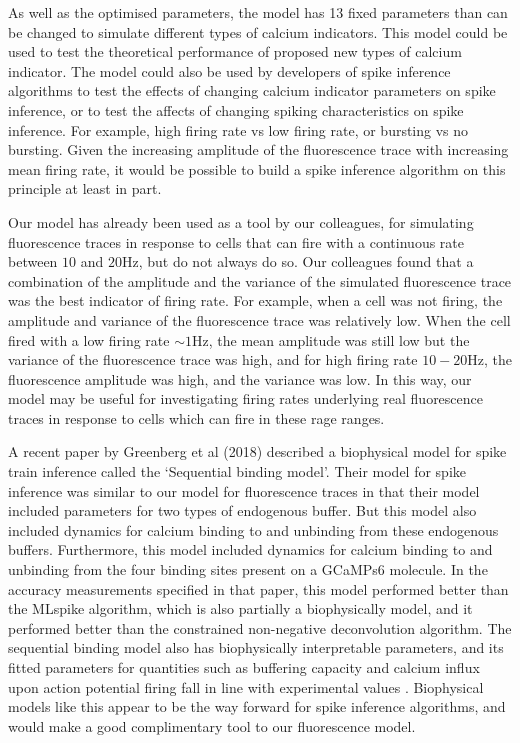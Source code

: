 As well as the optimised parameters, the model has 13 fixed parameters than can be changed to simulate different types of calcium indicators. This model could be used to test the theoretical performance of proposed new types of calcium indicator. The model could also be used by developers of spike inference algorithms to test the effects of changing calcium indicator parameters on spike inference, or to test the affects of changing spiking characteristics on spike inference. For example, high firing rate vs low firing rate, or bursting vs no bursting. Given the increasing amplitude of the fluorescence trace with increasing mean firing rate, it would be possible to build a spike inference algorithm on this principle at least in part.

Our model has already been used as a tool by our colleagues, for simulating fluorescence traces in response to cells that can fire with a continuous rate between $10$ and $20$Hz, but do not always do so. Our colleagues found that a combination of the amplitude and the variance of the simulated fluorescence trace was the best indicator of firing rate. For example, when a cell was not firing, the amplitude and variance of the fluorescence trace was relatively low. When the cell fired with a low firing rate $\sim 1$Hz, the mean amplitude was still low but the variance of the fluorescence trace was high, and for high firing rate $10-20$Hz, the fluorescence amplitude was high, and the variance was low. In this way, our model may be useful for investigating firing rates underlying real fluorescence traces in response to cells which can fire in these rage ranges.

A recent paper by Greenberg et al (2018) described a biophysical model for spike train inference called the `Sequential binding model'. Their model for spike inference was similar to our model for fluorescence traces in that their model included parameters for two types of endogenous buffer. But this model also included dynamics for calcium binding to and unbinding from these endogenous buffers. Furthermore, this model included dynamics for calcium binding to and unbinding from the four binding sites present on a GCaMPs6 molecule. In the accuracy measurements specified in that paper, this model performed better than the MLspike algorithm, which is also partially a biophysically model, and it performed better than the constrained non-negative deconvolution algorithm. The sequential binding model also has biophysically interpretable parameters, and its fitted parameters for quantities such as buffering capacity and calcium influx upon action potential firing fall in line with experimental values \parencite{greenberg}. Biophysical models like this appear to be the way forward for spike inference algorithms, and would make a good complimentary tool to our fluorescence model.
